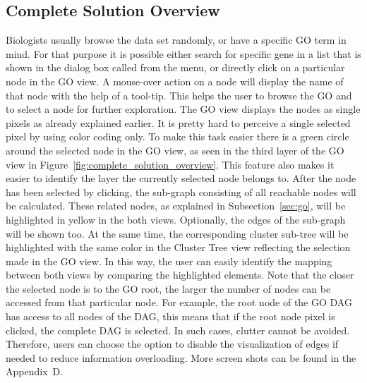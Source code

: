 




\subsection{Complete Solution Overview}
\label{sec:complete_solution_overview}

Biologists usually browse the data set randomly, or have a specific GO term in mind.
For that purpose it is possible either search for specific gene in a list that is shown in the dialog box called from the menu, or directly click on a particular node in the GO view.
A mouse-over action on a node will display the name of that node with the help of a tool-tip. This helps the user to browse the GO and to select a node for further exploration.
The GO view displays the nodes as single pixels as already explained earlier. It is pretty hard to perceive a single selected pixel by using color coding only.
To make this task easier there is a green circle around the selected node in the GO view, as seen in the third layer of the GO view in Figure~\ref{fig:complete_solution_overview}.
This feature also makes it easier to identify the layer the currently selected node belongs to.
After the node has been selected by clicking, the sub-graph consisting of all reachable nodes will be calculated.
These related nodes, as explained in Subsection~\ref{sec:go}, will be highlighted in yellow in the both views.
Optionally, the edges of the sub-graph will be shown too.
At the same time, the corresponding cluster sub-tree will be highlighted with the same color in the Cluster Tree view reflecting the selection made in the GO view.
In this way, the user can easily identify the mapping between both views by comparing the highlighted elements.
Note that the closer the selected node is to the GO root, the larger the number of nodes can be accessed from that particular node.
For example, the root node of the GO DAG has access to all nodes of the DAG, this means that if the root node pixel is clicked, the complete DAG is selected.
In such cases, clutter cannot be avoided. Therefore, users can choose the option to disable the visualization of edges if needed to reduce information overloading.
More screen shots can be found in the Appendix~D.

